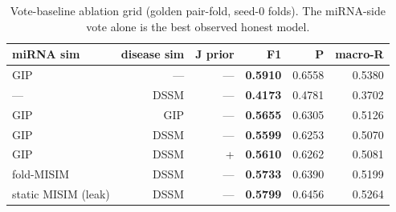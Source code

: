 \begin{table}[t]
\centering
\small
\caption{Vote-baseline ablation grid (golden pair-fold, seed-0 folds). The miRNA-side vote alone is the best observed honest model.}
\label{tab:ablation}
\begin{tabular}{@{}lrrrrr@{}}
\toprule
miRNA sim & disease sim & J prior & F1 & P & macro-R \\
\midrule
GIP & — & — & \textbf{0.5910} & 0.6558 & 0.5380 \\
— & DSSM & — & \textbf{0.4173} & 0.4781 & 0.3702 \\
GIP & GIP & — & \textbf{0.5655} & 0.6305 & 0.5126 \\
GIP & DSSM & — & \textbf{0.5599} & 0.6253 & 0.5070 \\
GIP & DSSM & + & \textbf{0.5610} & 0.6262 & 0.5081 \\
fold-MISIM & DSSM & — & \textbf{0.5733} & 0.6390 & 0.5199 \\
static MISIM (leak) & DSSM & — & \textbf{0.5799} & 0.6456 & 0.5264 \\
\bottomrule
\end{tabular}
\end{table}
